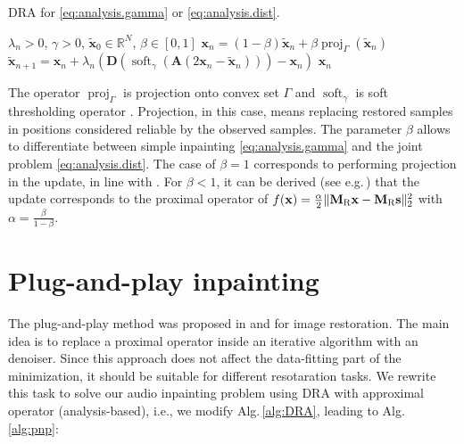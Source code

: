 \documentclass[conference]{IEEEtran}
\newcommand{\todo}[1]{\textcolor{red}{#1}}
\begin{document}
\begin{algorithm}
	\caption{DRA for \eqref{eq:analysis.gamma} or \eqref{eq:analysis.dist}.}
	\begin{algorithmic}[1]\label{alg:DRA}
		\renewcommand{\algorithmicrequire}{\textbf{Input:}}
		\renewcommand{\algorithmicensure}{\textbf{Output:}}
		\REQUIRE $ \lambda_n > 0 $, $ \gamma>0 $, $ \mathbf{\widetilde{x}}_0 \in \mathbb{R}^{N} $, $\beta \in [0, 1]$
		\STATE $\mathbf{x}_n= (1-\beta)\mathbf{\widetilde{x}}_n + \beta \operatorname{proj}_{\Gamma}(\mathbf{\widetilde{x}}_n) $ 
		\STATE $ \mathbf{\widetilde{x}}_{n+1} = \mathbf{x}_n + \lambda_n \left( \mathbf{D}\left(\operatorname{soft}_{\gamma}\left(\mathbf{A}\left(2\mathbf{x}_n-\mathbf{\widetilde{x}}_n\right) \right)\right) -\mathbf{x}_n\right)$
		\ENDFOR
		\RETURN $\mathbf{x}_n$ %
	\end{algorithmic} 
\end{algorithm}

The operator $ \operatorname{proj}_{\Gamma}$ is projection onto convex set $ \Gamma $ and $\operatorname{soft}_{\gamma}$ is soft thresholding operator \cite{Combettes2011}.
Projection, in this case, means replacing restored samples in positions considered reliable by the observed samples.
The parameter $\beta$ allows to differentiate between simple inpainting \eqref{eq:analysis.gamma} and the joint problem \eqref{eq:analysis.dist}.
The case of $\beta = 1$ corresponds to performing projection in the update, in line with \cite{Mokry2020}.
For $\beta < 1$, it can be derived (see e.g.\,\cite[Sec.\,4 and Tab.\,1]{Combettes2011}) that the update corresponds to the proximal operator of $f(\mathbf{x}) = \frac{\alpha}{2} \Vert \mathbf{M}_{\textup{R}} \mathbf {x} - \mathbf{M}_{\textup{R}} \mathbf{s} \Vert^2_2$ with $\alpha = \frac{\beta}{1-\beta}$.


\section{Plug-and-play inpainting} \label{sec:plugaandplay}

The plug-and-play method was proposed in \cite{Venkatakrishnan2013} and \cite{Chan2016} for image restoration.
The main idea is to replace a proximal operator inside an iterative algorithm with an denoiser.
Since this approach does not affect the data-fitting part of the minimization, it should be suitable for different resotaration tasks.
We rewrite this task to solve our audio inpainting problem using DRA with approximal operator (analysis-based), i.e., we modify Alg.\,\ref{alg:DRA}, leading to Alg.\,\ref{alg:pnp}:
\end{document}
